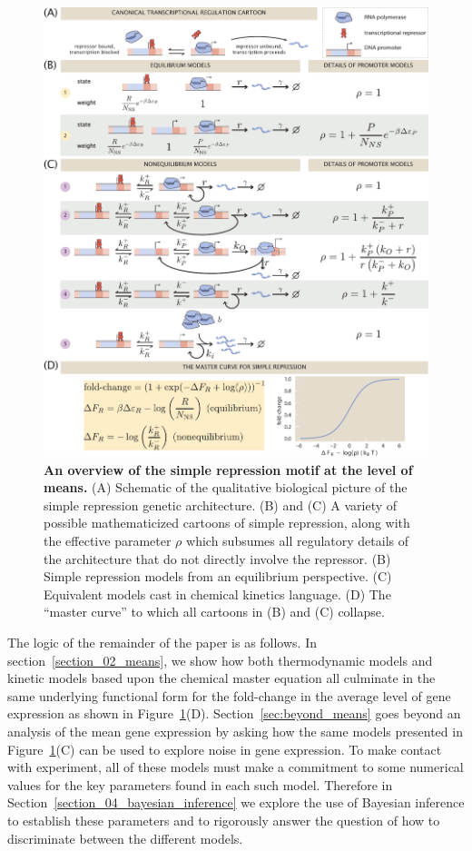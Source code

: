 \afterpage{\clearpage}
\begin{figure}[p]
\centering
\includegraphics[width=\textwidth]{../figures/main/fig01.pdf}
\caption{\textbf{An overview of the simple repression motif at the level of
means.} (A) Schematic of the qualitative biological picture of the simple
repression genetic architecture. (B) and (C) A variety of possible
mathematicized cartoons of simple repression, along with the effective parameter
$\rho$ which subsumes all regulatory details of the architecture that do not
directly involve the repressor. (B) Simple repression models from an equilibrium
perspective. (C) Equivalent models cast in chemical kinetics language. (D) The
``master curve'' to which all cartoons in (B) and (C) collapse.}
\label{fig1:means_cartoons}
\end{figure}

The logic of the remainder of the paper is as follows. In
section~\ref{section_02_means}, we show how both thermodynamic models and
kinetic models based upon the chemical master equation all culminate in the same
underlying functional form for the fold-change in the average level of gene
expression as shown in Figure~\ref{fig1:means_cartoons}(D).
Section~\ref{sec:beyond_means} goes beyond an analysis of the mean gene
expression by asking how the same models presented in
Figure~\ref{fig1:means_cartoons}(C) can be used to explore noise in gene
expression. To make contact with experiment, all of these models must make a
commitment to some numerical values for the key parameters found in each such
model. Therefore in Section~\ref{section_04_bayesian_inference} we explore the
use of Bayesian inference to establish these parameters and to rigorously answer
the question of how to discriminate between the different models.


